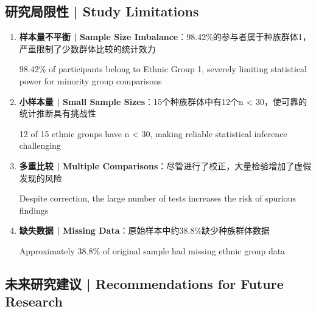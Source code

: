 \documentclass[12pt,a4paper]{article}
\begin{document}
\subsection{研究局限性 | Study Limitations}

\begin{enumerate}
    \item \textbf{样本量不平衡 | Sample Size Imbalance}：98.42\%的参与者属于种族群体1，严重限制了少数群体比较的统计效力
    
    98.42\% of participants belong to Ethnic Group 1, severely limiting statistical power for minority group comparisons
    
    \item \textbf{小样本量 | Small Sample Sizes}：15个种族群体中有12个n < 30，使可靠的统计推断具有挑战性
    
    12 of 15 ethnic groups have n < 30, making reliable statistical inference challenging
    
    \item \textbf{多重比较 | Multiple Comparisons}：尽管进行了校正，大量检验增加了虚假发现的风险
    
    Despite correction, the large number of tests increases the risk of spurious findings
    
    \item \textbf{缺失数据 | Missing Data}：原始样本中约38.8\%缺少种族群体数据
    
    Approximately 38.8\% of original sample had missing ethnic group data
\end{enumerate}

\subsection{未来研究建议 | Recommendations for Future Research}
\end{document}
